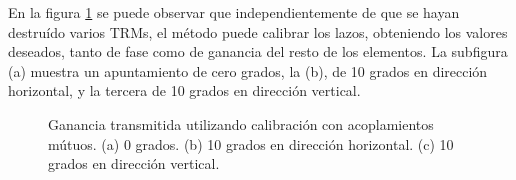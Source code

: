 En la figura \ref{fig:deadTRMsMutual} se puede observar que independientemente de que se hayan destruído varios TRMs, el 
método puede calibrar los lazos, obteniendo los valores deseados, tanto de fase como de ganancia del resto de los elementos.
La subfigura (a) muestra un apuntamiento de cero grados, la (b), de 10 grados en dirección horizontal, y la tercera de 10 grados
en dirección vertical.
\begin{figure}[H]
	\centering
 	
		\caption{Ganancia transmitida utilizando calibración con acoplamientos mútuos. (a) 0 grados. (b) 10 grados en 
		dirección horizontal. (c) 10 grados en dirección vertical.}
	\label{fig:deadTRMsMutual}
\end{figure}
